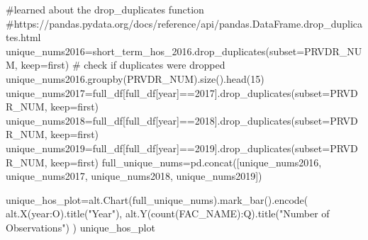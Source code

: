 \documentclass[
  letterpaper,
  DIV=11,
  numbers=noendperiod]{scrartcl}
\newenvironment{Shaded}{\begin{snugshade}}{\end{snugshade}}
\newcommand{\CommentTok}[1]{\textcolor[rgb]{0.37,0.37,0.37}{#1}}
\newcommand{\DecValTok}[1]{\textcolor[rgb]{0.68,0.00,0.00}{#1}}
\newcommand{\NormalTok}[1]{\textcolor[rgb]{0.00,0.23,0.31}{#1}}
\newcommand{\OperatorTok}[1]{\textcolor[rgb]{0.37,0.37,0.37}{#1}}
\newcommand{\StringTok}[1]{\textcolor[rgb]{0.13,0.47,0.30}{#1}}
\begin{document}
\begin{Shaded}
\begin{Highlighting}[]
\CommentTok{\#learned about the drop\_duplicates function }
\CommentTok{\#https://pandas.pydata.org/docs/reference/api/pandas.DataFrame.drop\_duplicates.html}
\NormalTok{unique\_nums2016}\OperatorTok{=}\NormalTok{short\_term\_hos\_2016.drop\_duplicates(subset}\OperatorTok{=}\StringTok{\textquotesingle{}PRVDR\_NUM\textquotesingle{}}\NormalTok{, keep}\OperatorTok{=}\StringTok{\textquotesingle{}first\textquotesingle{}}\NormalTok{)}
\CommentTok{\# check if duplicates were dropped}
\NormalTok{unique\_nums2016.groupby(}\StringTok{\textquotesingle{}PRVDR\_NUM\textquotesingle{}}\NormalTok{).size().head(}\DecValTok{15}\NormalTok{)}
\NormalTok{unique\_nums2017}\OperatorTok{=}\NormalTok{full\_df[full\_df[}\StringTok{\textquotesingle{}year\textquotesingle{}}\NormalTok{]}\OperatorTok{==}\DecValTok{2017}\NormalTok{].drop\_duplicates(subset}\OperatorTok{=}\StringTok{\textquotesingle{}PRVDR\_NUM\textquotesingle{}}\NormalTok{, keep}\OperatorTok{=}\StringTok{\textquotesingle{}first\textquotesingle{}}\NormalTok{)}
\NormalTok{unique\_nums2018}\OperatorTok{=}\NormalTok{full\_df[full\_df[}\StringTok{\textquotesingle{}year\textquotesingle{}}\NormalTok{]}\OperatorTok{==}\DecValTok{2018}\NormalTok{].drop\_duplicates(subset}\OperatorTok{=}\StringTok{\textquotesingle{}PRVDR\_NUM\textquotesingle{}}\NormalTok{, keep}\OperatorTok{=}\StringTok{\textquotesingle{}first\textquotesingle{}}\NormalTok{)}
\NormalTok{unique\_nums2019}\OperatorTok{=}\NormalTok{full\_df[full\_df[}\StringTok{\textquotesingle{}year\textquotesingle{}}\NormalTok{]}\OperatorTok{==}\DecValTok{2019}\NormalTok{].drop\_duplicates(subset}\OperatorTok{=}\StringTok{\textquotesingle{}PRVDR\_NUM\textquotesingle{}}\NormalTok{, keep}\OperatorTok{=}\StringTok{\textquotesingle{}first\textquotesingle{}}\NormalTok{)}
\NormalTok{full\_unique\_nums}\OperatorTok{=}\NormalTok{pd.concat([unique\_nums2016, unique\_nums2017, unique\_nums2018, unique\_nums2019])}
\end{Highlighting}
\end{Shaded}

\begin{Shaded}
\begin{Highlighting}[]
\NormalTok{unique\_hos\_plot}\OperatorTok{=}\NormalTok{alt.Chart(full\_unique\_nums).mark\_bar().encode(}
\NormalTok{    alt.X(}\StringTok{\textquotesingle{}year:O\textquotesingle{}}\NormalTok{).title(}\StringTok{"Year"}\NormalTok{),}
\NormalTok{    alt.Y(}\StringTok{\textquotesingle{}count(FAC\_NAME):Q\textquotesingle{}}\NormalTok{).title(}\StringTok{"Number of Observations"}\NormalTok{)}
\NormalTok{)}
\NormalTok{unique\_hos\_plot}
\end{Highlighting}
\end{Shaded}
\end{document}
